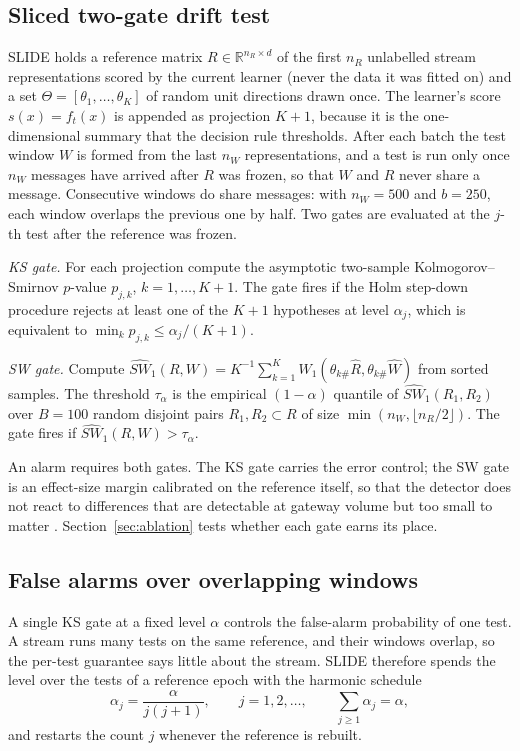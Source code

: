 \subsection{Sliced two-gate drift test}\label{sec:test}
SLIDE holds a reference matrix $R\in\mathbb{R}^{n_R\times d}$ of the first $n_R$ unlabelled stream representations scored by the current learner (never the data it was fitted on) and a set $\Theta=[\theta_1,\dots,\theta_K]$ of random unit directions drawn once. The learner's score $s(x)=f_t(x)$ is appended as projection $K+1$, because it is the one-dimensional summary that the decision rule thresholds. After each batch the test window $W$ is formed from the last $n_W$ representations, and a test is run only once $n_W$ messages have arrived after $R$ was frozen, so that $W$ and $R$ never share a message. Consecutive windows do share messages: with $n_W=500$ and $b=250$, each window overlaps the previous one by half. Two gates are evaluated at the $j$-th test after the reference was frozen.

\emph{KS gate.} For each projection compute the asymptotic two-sample Kolmogorov--Smirnov $p$-value $p_{j,k}$, $k=1,\dots,K+1$. The gate fires if the Holm step-down procedure rejects at least one of the $K+1$ hypotheses at level $\alpha_j$, which is equivalent to $\min_k p_{j,k}\le\alpha_j/(K+1)$.

\emph{SW gate.} Compute $\widehat{SW}_1(R,W)=K^{-1}\sum_{k=1}^K W_1(\theta_{k\#}\hat R,\theta_{k\#}\hat W)$ from sorted samples. The threshold $\tau_\alpha$ is the empirical $(1-\alpha)$ quantile of $\widehat{SW}_1(R_1,R_2)$ over $B=100$ random disjoint pairs $R_1,R_2\subset R$ of size $\min(n_W,\lfloor n_R/2\rfloor)$. The gate fires if $\widehat{SW}_1(R,W)>\tau_\alpha$.

An alarm requires both gates. The KS gate carries the error control; the SW gate is an effect-size margin calibrated on the reference itself, so that the detector does not react to differences that are detectable at gateway volume but too small to matter \cite{demsar2006}. Section~\ref{sec:ablation} tests whether each gate earns its place.

\subsection{False alarms over overlapping windows}\label{sec:spend}
A single KS gate at a fixed level $\alpha$ controls the false-alarm probability of one test. A stream runs many tests on the same reference, and their windows overlap, so the per-test guarantee says little about the stream. SLIDE therefore spends the level over the tests of a reference epoch with the harmonic schedule
\begin{equation}
\alpha_j=\frac{\alpha}{j(j+1)},\qquad j=1,2,\dots,\qquad \sum_{j\ge1}\alpha_j=\alpha ,
\label{eq:spend}
\end{equation}
and restarts the count $j$ whenever the reference is rebuilt.

